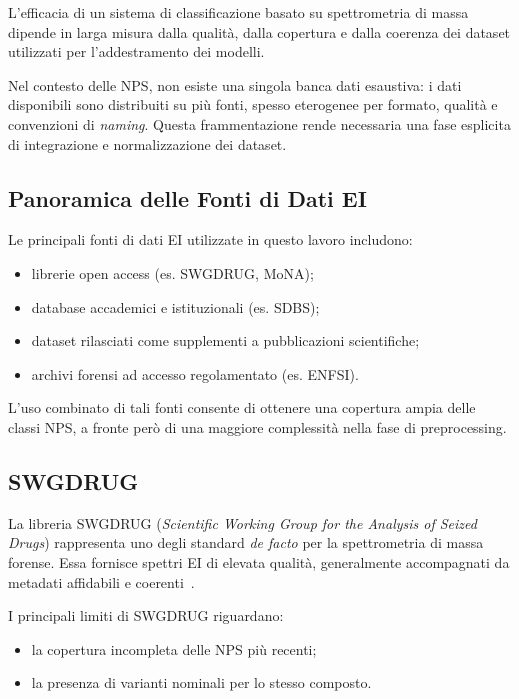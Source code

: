 L’efficacia di un sistema di classificazione basato su spettrometria di massa dipende in larga misura dalla qualità, dalla copertura e dalla coerenza dei dataset utilizzati per l’addestramento dei modelli.

Nel contesto delle NPS, non esiste una singola banca dati esaustiva: i dati disponibili sono distribuiti su più fonti, spesso eterogenee per formato, qualità e convenzioni di \textit{naming}.
Questa frammentazione rende necessaria una fase esplicita di integrazione e normalizzazione dei dataset.

\subsection{Panoramica delle Fonti di Dati EI}
\label{subsec:ei_sources}

Le principali fonti di dati EI utilizzate in questo lavoro includono:
\begin{itemize}
    \item librerie open access (es. SWGDRUG, MoNA);
    \item database accademici e istituzionali (es. SDBS);
    \item dataset rilasciati come supplementi a pubblicazioni scientifiche;
    \item archivi forensi ad accesso regolamentato (es. ENFSI).
\end{itemize}

L’uso combinato di tali fonti consente di ottenere una copertura ampia delle classi NPS, a fronte però di una maggiore complessità nella fase di preprocessing.

\subsection{SWGDRUG}
\label{subsec:swgdrug}

La libreria SWGDRUG (\emph{Scientific Working Group for the Analysis of Seized Drugs}) rappresenta uno degli standard \textit{de facto} per la spettrometria di massa forense.
Essa fornisce spettri EI di elevata qualità, generalmente accompagnati da metadati affidabili e coerenti~\cite{swgdrug}.

I principali limiti di SWGDRUG riguardano:
\begin{itemize}
    \item la copertura incompleta delle NPS più recenti;
    \item la presenza di varianti nominali per lo stesso composto.
\end{itemize}

